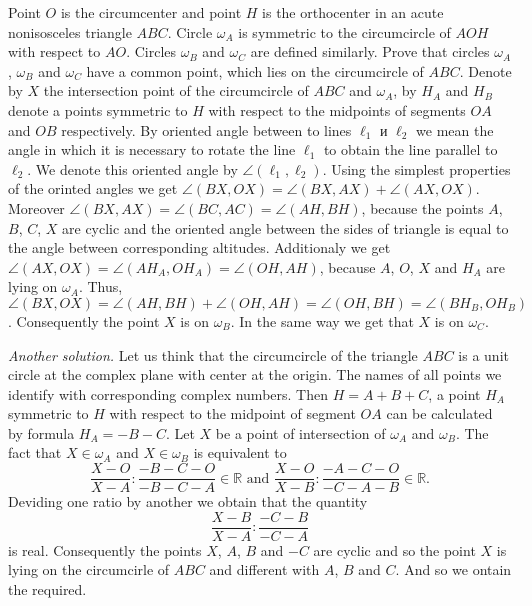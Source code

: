 \problem
Point $O$ is the circumcenter and point $H$ is the orthocenter in an acute
nonisosceles triangle $ABC$.
Circle $\omega_A$ is symmetric to the circumcircle of $AOH$ with respect to
$AO$.
Circles $\omega_B$ and $\omega_C$ are defined similarly.
Prove that circles $\omega_A$, $\omega_B$ and $\omega_C$ have a common point,
which lies on the circumcircle of $ABC$.
\solution
Denote by $X$ the intersection point of the circumcircle of $ABC$ and
$\omega_A$, by $H_A$ and $H_B$ denote a points symmetric to $H$ with respect to
the midpoints of segments $OA$ and $OB$ respectively.
By oriented angle between to lines $\ell_1$ и $\ell_2$ we mean the angle in
which it is necessary to rotate the line $\ell_1$ to obtain the line parallel
to $\ell_2$.
We denote this oriented angle by $\angle (\ell_1, \ell_2)$.
Using the simplest properties of the orinted angles we get
$\angle(BX, OX) = \angle(BX, AX) + \angle(AX, OX)$.
Moreover $\angle(BX, AX) = \angle (BC, AC) = \angle (AH, BH)$, because the
points $A$, $B$, $C$, $X$ are cyclic and the oriented angle between the sides
of triangle is equal to the angle between corresponding altitudes.
Additionaly we get $\angle(AX, OX) = \angle(A H_A, O H_A) = \angle (OH, AH)$,
because $A$, $O$, $X$ and  $H_A$ are lying on $\omega_A$.
Thus,
\(
    \angle (BX, OX) = \angle (AH, BH) + \angle (OH, AH) =
    \angle (OH, BH) = \angle (B H_B, O H_B)
\).
Consequently the point $X$ is on $\omega_B$.
In the same way we get that $X$  is on $\omega_C$.
\par
\emph{Another solution.} 
Let us think that the circumcircle of the triangle $ABC$ is a unit circle at
the complex plane with center at the origin.
The names of all points we identify with corresponding complex numbers.
Then $H = A + B + C$, a point $H_A$ symmetric to $H$ with respect to the
midpoint of segment $OA$ can be calculated by formula $H_A = - B - C$.
Let $X$ be a point of intersection of $\omega_A$ and $\omega_B$.
The fact that $X \in \omega_A$ and $X \in \omega_B$ is equivalent to 
\[
    \frac{X - O}{X - A} : \frac{- B - C - O}{- B - C - A}
        \in {\mathbb R}
\mbox{ and }
    \frac{X - O}{X - B} : \frac{- A - C - O}{- C - A - B}
        \in {\mathbb R}
.\]
Deviding one ratio by another we obtain that the quantity
\[
    \frac{X - B}{X - A} : \frac{- C - B}{- C - A}
\]
is real.
Consequently the points $X$, $A$, $B$ and $-C$ are cyclic and so the point $X$
is lying on the circumcirle of $ABC$ and different with $A$, $B$ and $C$.
And so we ontain the required.
\endproblem
